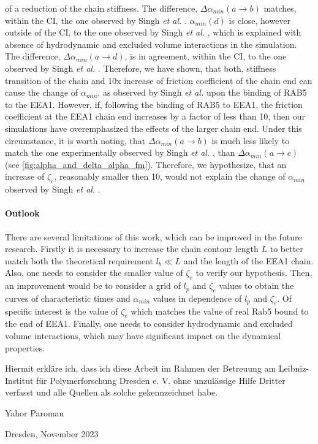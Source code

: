 \documentclass[
    paper=A4,pagesize=automedia,fontsize=12pt,
    BCOR=15mm,DIV=22,
    twoside,headinclude,footinclude=false,
    fleqn,             %
    bibliography=totocnumbered,          %
    listof=totoc,                %
    listof=flat,                 %
    cleardoublepage=empty      %
    numbers=endperiod
]{scrartcl}
\begin{document}
of a reduction of the chain stiffness.
The difference, $\Delta \alpha_{min}(a \rightarrow b)$ 
matches, within the CI, the one observed by Singh \emph{et al.} \cite{Singh:2022}.
$\alpha_{min}(d)$ is close, however outside of the CI, 
to the one observed by Singh \emph{et al.} \cite{Singh:2022}, 
which is explained with absence of hydrodynamic
and excluded volume interactions in the simulation. 
The difference, $\Delta \alpha_{min}(a \rightarrow d)$,
is in agreement, within the CI, to the one observed by Singh \emph{et al.} \cite{Singh:2022}.
Therefore, we have shown, that both, stiffness transition of the chain
and 10x increase of friction coefficient of the chain end can cause the change
of $\alpha_{min}$, as observed by Singh \emph{et al.} \cite{Singh:2022} 
upon the binding of RAB5 to the EEA1. However, if, following the binding of RAB5 to EEA1, 
the friction coefficient at the EEA1 chain end increases by a factor of less than 10, then   
our simulations have overemphasized the effects of the larger chain end. 
Under this circumstance, it is worth noting, that 
$\Delta \alpha_{min} (a \rightarrow b)$ is much less likely 
to match the one experimentally observed by Singh \emph{et al.} \cite{Singh:2022},  
than $\Delta \alpha_{min} (a \rightarrow c)$ (see \autoref{fig:alpha_and_delta_alpha_fm}). 
Therefore, we hypothesize, that an
increase of $\zeta_e$, reasonably smaller then 10, 
would not explain the change of $\alpha_{min}$ observed by
Singh \emph{et al.} \cite{Singh:2022}.



\paragraph{Outlook}
There are several limitations of this work, which can be improved in the future research.
Firstly it is necessary to increase the chain contour length $L$ to better match both the
theoretical requirement $l_b \ll L$ and the length of the EEA1 chain. Also, one needs to
consider the smaller value of $\zeta_e$ to verify our hypothesis. Then, an improvement 
would be to consider a grid of $l_p$ and $\zeta_e$ values to obtain the 
curves of characteristic times and $\alpha_{min}$ values in dependence of 
$l_p$ and $\zeta_e$. Of specific interest is the value of $\zeta_e$ which matches 
the value of real Rab5 bound to the end of EEA1. Finally, one needs to
consider hydrodynamic and excluded volume interactions, 
which may have significant impact on the dynamical properties.  


\clearpage
\thispagestyle{empty}
\vspace*{1.5em}

Hiermit erkläre ich, dass ich diese Arbeit im Rahmen der Betreuung am Leibniz-Institut für Polymerforschung Dresden e. V.
ohne unzulässige Hilfe Dritter verfasst und alle Quellen als solche gekennzeichnet habe.

\vspace*{45em}

Yahor Paromau \par
Dresden, November 2023



\end{document}
